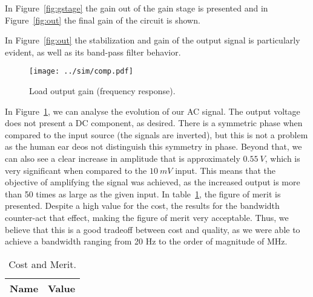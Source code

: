 In Figure~\ref{fig:gstage} the gain out of the gain stage is presented and in Figure~\ref{fig:out} the final gain of the circuit is shown.

In Figure~\ref{fig:out} the stabilization and gain of the output signal is particularly evident, as well as its band-pass filter behavior.

\begin{figure}[h] \centering
\texttt{[image: ../sim/comp.pdf]}
        \caption{Load output gain (frequency response).}
\label{fig:comp}
\end{figure}



In Figure~\ref{fig:comp}, we can analyse the evolution of our AC signal. The output voltage does not present a DC component, as desired. There is a symmetric phase when compared to the input source (the signals are inverted), but this is not a problem as the human ear deos not distinguish this symmetry in phase. Beyond that, we can also see a clear increase in amplitude that is approximately $0.55~V$, which is very significant when compared to the $10~mV$ input. This means that the objective of amplifying the signal was achieved, as the increased output is more than 50 times as large as the given input.
In table~\ref{tab:merit}, the figure of merit is presented. Despite a high value for the cost, the results for the bandwidth counter-act that effect, making the figure of merit very acceptable. Thus, we believe that this is a good tradeoff between cost and quality, as we were able to achieve a bandwidth ranging from 20 Hz to the order of magnitude of MHz.



\begin{table}[h]
  \centering
  \begin{tabular}{|l|r|}
    \hline    
    {\bf Name} & {\bf Value} \\ \hline
    
  \end{tabular}
  \caption{Cost and Merit.}
  \label{tab:merit}
\end{table}



